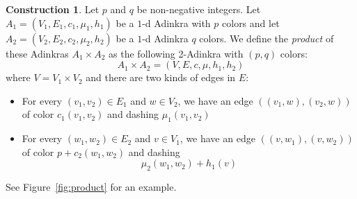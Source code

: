 \documentclass[12pt,twoside,singlespace]{article}
\numberwithin{equation}{section}
\theoremstyle{definition}
\newtheorem{construction}[equation]{Construction}
\begin{document}
\begin{construction}
Let $p$ and $q$ be non-negative integers.  Let $A_1=(V_1, E_1, c_1, \mu_1,h_1)$ be a $1$-d Adinkra with $p$ colors and let $A_2=(V_2, E_2, c_2, \mu_2,h_2)$ be a $1$-d Adinkra $q$ colors.  We define the \emph{product} of these Adinkras $A_1\times A_2$ as the following 2-Adinkra with $(p,q)$ colors:
\[A_1\times A_2=(V,E,c,\mu,h_1,h_2)\]
where $V=V_1\times V_2$ and there are two kinds of edges in $E$:
\begin{itemize}
\item For every $(v_1,v_2)\in E_1$ and $w\in V_2$, we have an edge $((v_1,w),(v_2,w))$ of color $c_1(v_1,v_2)$ and dashing $\mu_1(v_1,v_2)$
\item For every $(w_1,w_2)\in E_2$ and $v\in V_1$, we have an edge $((v,w_1),(v,w_2))$ of color $p+c_2(w_1,w_2)$ and dashing
\begin{equation}
\label{eqn:dashprodshift}
\mu_2(w_1,w_2)+h_1(v)
\end{equation}
\end{itemize}
 See Figure~\ref{fig:product} for an example.
\end{construction}
\end{document}
